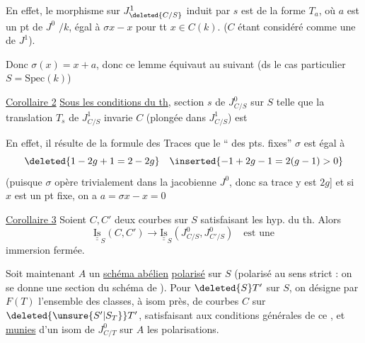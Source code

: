 En effet, le morphisme sur $J^1_{\deleted{C/S}}$ induit par $s$ est de la forme $T_a$, où $a$ est un pt de $J^0$  $/k$, égal à $\sigma x-x$ pour tt $x\in C(k)$. ($C$ étant considéré comme une  de $J^1$).

Donc $\sigma(x)=x+a$, donc ce lemme équivaut au suivant (ds le cas particulier $S=\mathrm{Spec}(k)$)

\uline{Corollaire 2} \uline{Sous les conditions du th},   section $s$ de $J^0_{C/S}$ sur $S$ telle que la translation $T_s$ de $J^1_{C/S}$ invarie $C$ (plongée dans $J^1_{C/S}$) est  

En effet, il résulte de la formule des Traces que le `` des pts. fixes''  $\sigma$ est égal à
\[
\deleted{1-2g+1=2-2g}\quad \inserted{-1+2g-1=2(g-1)>0}
\]
(puisque $\sigma$ opère trivialement dans la jacobienne $J^0$, donc sa trace y est $2g$] et si $x$ est un pt fixe, on a $a=\sigma x-x=0$




  \uline{Corollaire 3} Soient $C,C'$ deux courbes sur $S$ satisfaisant les hyp. du th. Alors
\[
\underline{\underline{\mathrm{Is}}}_S(C,C')\longrightarrow\underline{\underline{\mathrm{Is}}}_S(J^0_{C/S},J^0_{C'/S})\quad\text{est une}
\]
immersion fermée.

Soit maintenant $A$ un \uline{schéma abélien} \uline{polarisé} sur $S$  (polarisé au sens strict : on se donne une section du schéma de ). Pour  $\deleted{S}T'$ sur $S$, on désigne par $F(T)$ l'ensemble des classes, à isom près, de courbes $C$ sur $\deleted{\unsure{S'|S_T}}T'$, satisfaisant aux conditions générales de ce , et \uline{munies} d'un isom de $J^0_{C/T}$ sur $A$   les polarisations.

